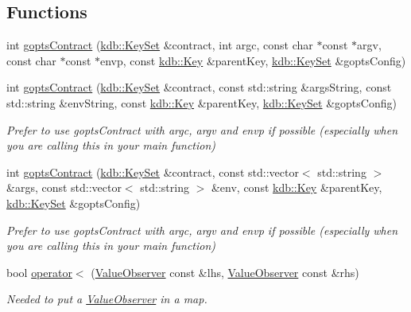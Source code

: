 \subsection*{Functions}
\begin{DoxyCompactItemize}
\item 
int \hyperlink{namespacekdb_afc8477f4bb768ada40b8e4b82d9fcaf0}{gopts\+Contract} (\hyperlink{classkdb_1_1KeySet}{kdb\+::\+Key\+Set} \&contract, int argc, const char $\ast$const $\ast$argv, const char $\ast$const $\ast$envp, const \hyperlink{classkdb_1_1Key}{kdb\+::\+Key} \&parent\+Key, \hyperlink{classkdb_1_1KeySet}{kdb\+::\+Key\+Set} \&gopts\+Config)
\item 
int \hyperlink{namespacekdb_a90e4547be745a211a4ad95bdd27d0254}{gopts\+Contract} (\hyperlink{classkdb_1_1KeySet}{kdb\+::\+Key\+Set} \&contract, const std\+::string \&args\+String, const std\+::string \&env\+String, const \hyperlink{classkdb_1_1Key}{kdb\+::\+Key} \&parent\+Key, \hyperlink{classkdb_1_1KeySet}{kdb\+::\+Key\+Set} \&gopts\+Config)
\begin{DoxyCompactList}\small\item\em Prefer to use gopts\+Contract with argc, argv and envp if possible (especially when you are calling this in your main function) \end{DoxyCompactList}\item 
int \hyperlink{namespacekdb_afa8d46930ac176c22c7f4e77c776d08e}{gopts\+Contract} (\hyperlink{classkdb_1_1KeySet}{kdb\+::\+Key\+Set} \&contract, const std\+::vector$<$ std\+::string $>$ \&args, const std\+::vector$<$ std\+::string $>$ \&env, const \hyperlink{classkdb_1_1Key}{kdb\+::\+Key} \&parent\+Key, \hyperlink{classkdb_1_1KeySet}{kdb\+::\+Key\+Set} \&gopts\+Config)
\begin{DoxyCompactList}\small\item\em Prefer to use gopts\+Contract with argc, argv and envp if possible (especially when you are calling this in your main function) \end{DoxyCompactList}\item 
bool \hyperlink{namespacekdb_a53a162c7ff73150a3f6e6ab9d191aab0}{operator$<$} (\hyperlink{classkdb_1_1ValueObserver}{Value\+Observer} const \&lhs, \hyperlink{classkdb_1_1ValueObserver}{Value\+Observer} const \&rhs)
\begin{DoxyCompactList}\small\item\em Needed to put a \hyperlink{classkdb_1_1ValueObserver}{Value\+Observer} in a map. \end{DoxyCompactList}\item 

\end{DoxyCompactItemize}
